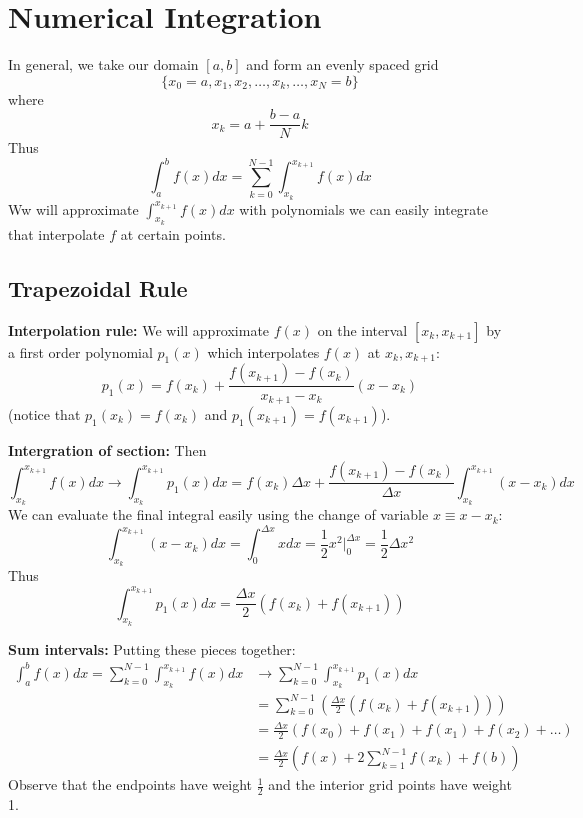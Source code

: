 \documentclass[12pt]{article}
\theoremstyle{definition}
\theoremstyle{definition}
\begin{document}
\section{Numerical Integration}

In general, we take our domain $[a,b]$ and form an evenly spaced grid
\begin{equation}
	\{x_0=a, x_1, x_2, \ldots, x_k, \ldots, x_N=b\}
\end{equation} 
where
\begin{equation}
	x_k = a + \frac{b-a}{N}k
\end{equation}
Thus
\begin{equation}
	\int_a^b f(x)dx = \sum_{k=0}^{N-1} \int_{x_k}^{x_{k+1}} f(x) dx
\end{equation}
Ww will approximate $\int_{x_k}^{x_{k+1}} f(x) dx$ with polynomials we can easily integrate that interpolate $f$ at certain points.

\subsection{Trapezoidal Rule}
\textbf{Interpolation rule:} We will approximate $f(x)$ on the interval $[x_k,x_{k+1}]$ by a first order polynomial $p_1(x)$ which interpolates $f(x)$ at $x_k, x_{k+1}$:
\begin{equation}
	p_1(x) = f(x_k) + \frac{f(x_{k+1}) - f(x_k)}{x_{k+1} - x_k} (x - x_k)
\end{equation}
(notice that $p_1(x_k) = f(x_k)$ and $p_1(x_{k+1}) = f(x_{k+1})$).

\textbf{Intergration of section:} Then
\begin{equation}
	\int_{x_k}^{x_{k+1}} f(x) dx \to \int_{x_k}^{x_{k+1}} p_1(x)dx = f(x_k) \Delta x + \frac{f(x_{k+1}) - f(x_k)}{\Delta x} \int_{x_k}^{x_{k+1}} (x-x_k) dx
\end{equation}
We can evaluate the final integral easily using the change of variable $x \equiv x - x_k$:
\begin{equation}
	\int_{x_k}^{x_{k+1}} (x-x_k) dx = \int_{0}^{\Delta x} x dx = \frac{1}{2}x^2 \bigg\rvert_0^{\Delta x} = \frac{1}{2}\Delta x^2
\end{equation}
Thus 
\begin{equation}
	\int_{x_k}^{x_{k+1}} p_1(x)dx = \frac{\Delta x}{2} (f(x_k) + f(x_{k+1}))
\end{equation}

\textbf{Sum intervals:} Putting these pieces together:
\begin{align*}
	\int_a^b f(x)dx = \sum_{k=0}^{N-1} \int_{x_k}^{x_{k+1}} f(x) dx &\to \sum_{k=0}^{N-1} \int_{x_k}^{x_{k+1}} p_1(x)dx \\
	&= \sum_{k=0}^{N-1} \left(\frac{\Delta x}{2} (f(x_k) + f(x_{k+1})) \right) \\
	&= \frac{\Delta x}{2} (f(x_0) + f(x_1) + f(x_1) + f(x_2) + \ldots ) \\
	&= \frac{\Delta x}{2} (f(x) + 2 \sum_{k=1}^{N-1} f(x_k) + f(b))
\end{align*}
Observe that the endpoints have weight $\frac{1}{2}$ and the interior grid points have weight 1.
\end{document}
